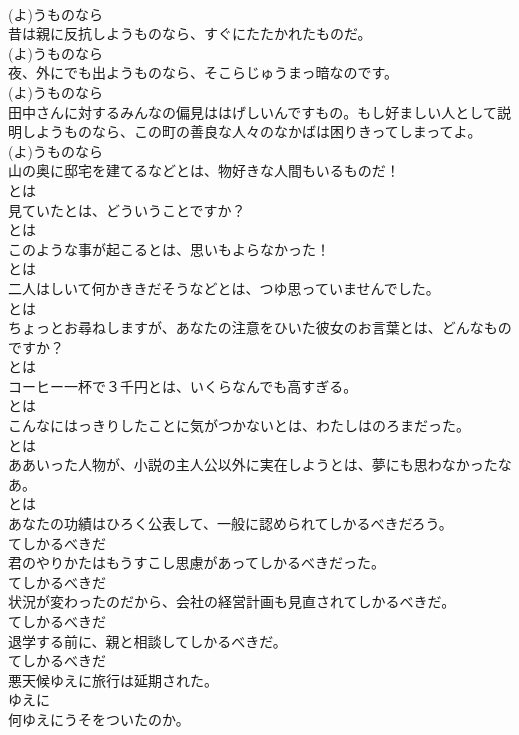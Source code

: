 \documentclass[8pt]{extreport}
\begin{document}
\begin{CJK}{UTF8}{min}
\\	(よ)うものなら
\\	昔は親に反抗しようものなら、すぐにたたかれたものだ。	
\\	(よ)うものなら
\\	夜、外にでも出ようものなら、そこらじゅうまっ暗なのです。	
\\	(よ)うものなら
\\	田中さんに対するみんなの偏見ははげしいんですもの。もし好ましい人として説明しようものなら、この町の善良な人々のなかばは困りきってしまってよ。	
\\	(よ)うものなら
\\	山の奥に邸宅を建てるなどとは、物好きな人間もいるものだ！	
\\	とは
\\	見ていたとは、どういうことですか？	
\\	とは
\\	このような事が起こるとは、思いもよらなかった！	
\\	とは
\\	二人はしいて何かききだそうなどとは、つゆ思っていませんでした。	
\\	とは
\\	ちょっとお尋ねしますが、あなたの注意をひいた彼女のお言葉とは、どんなものですか？	
\\	とは
\\	コーヒー一杯で３千円とは、いくらなんでも高すぎる。	
\\	とは
\\	こんなにはっきりしたことに気がつかないとは、わたしはのろまだった。	
\\	とは
\\	ああいった人物が、小説の主人公以外に実在しようとは、夢にも思わなかったなあ。	
\\	とは
\\	あなたの功績はひろく公表して、一般に認められてしかるべきだろう。	
\\	てしかるべきだ
\\	君のやりかたはもうすこし思慮があってしかるべきだった。	
\\	てしかるべきだ
\\	状況が変わったのだから、会社の経営計画も見直されてしかるべきだ。	
\\	てしかるべきだ
\\	退学する前に、親と相談してしかるべきだ。	
\\	てしかるべきだ
\\	悪天候ゆえに旅行は延期された。	
\\	ゆえに
\\	何ゆえにうそをついたのか。	

\end{CJK}
\end{document}
